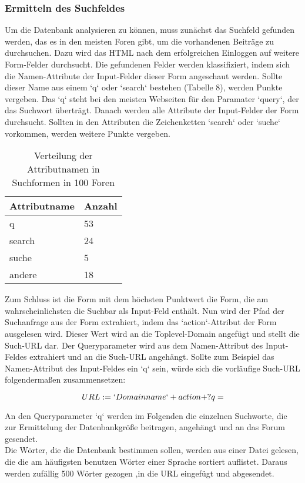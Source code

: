 \subsubsection{Ermitteln des Suchfeldes}
Um die Datenbank analysieren zu können, muss zunächst das Suchfeld gefunden werden, das es in den meisten Foren gibt, um die vorhandenen Beiträge zu durchsuchen.
Dazu wird das HTML nach dem erfolgreichen Einloggen auf weitere Form-Felder durchsucht. Die gefundenen Felder werden klassifiziert, indem sich die Namen-Attribute der Input-Felder dieser Form angeschaut werden. Sollte dieser Name aus einem `q` oder `search` bestehen (Tabelle 8), werden Punkte vergeben. Das `q` steht bei den meisten Webseiten für den Paramater `query`, der das Suchwort überträgt.
Danach werden alle Attribute der Input-Felder der Form durchsucht. Sollten in den Attributen die Zeichenketten `search` oder `suche` vorkommen, werden weitere Punkte vergeben.

\begin{table}[h!]
\centering 
\begin{tabular}{ | p{3cm} | p{3cm}|} \hline
\textbf{Attributname} & \textbf{Anzahl} \\ \hline
q & 53 \\ \hline
search & 24 \\ \hline
suche & 5 \\ \hline
andere & 18 \\ \hline
\end{tabular}
\caption{Verteilung der Attributnamen in Suchformen in 100 Foren}
\end{table}

Zum Schluss ist die Form mit dem höchsten Punktwert die Form, die am wahrscheinlichsten die Suchbar als Input-Feld enthält.
Nun wird der Pfad der Suchanfrage aus der Form extrahiert, indem das `action`-Attribut der Form ausgelesen wird. Dieser Wert wird an die Toplevel-Domain angefügt und stellt die Such-URL dar. Der Queryparameter wird aus dem Namen-Attribut des Input-Feldes extrahiert und an die Such-URL angehängt. Sollte zum Beispiel das Namen-Attribut des Input-Feldes ein `q` sein, würde sich die vorläufige Such-URL folgendermaßen zusammensetzen:

\[ URL := `Domainname` + action + ?q= \]

An den Queryparameter `q` werden im Folgenden die einzelnen Suchworte, die zur Ermittelung der Datenbankgröße beitragen, angehängt und an das Forum gesendet.\\
Die Wörter, die die Datenbank bestimmen sollen, werden aus einer Datei gelesen, die die am häufigsten benutzen Wörter einer Sprache sortiert auflistet. Daraus werden zufällig 500 Wörter gezogen ,in die URL eingefügt und abgesendet.

